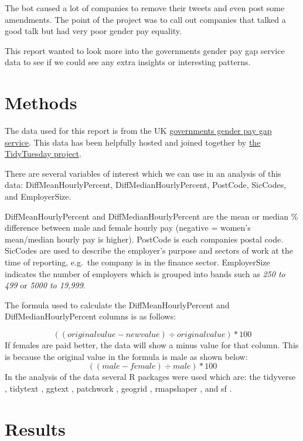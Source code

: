 \documentclass[
  11pt,
]{article}
\begin{document}
The bot caused a lot of companies to remove their tweets and even post
some amendments. The point of the project was to call out companies that
talked a good talk but had very poor gender pay equality.

This report wanted to look more into the governments gender pay gap
service data to see if we could see any extra insights or interesting
patterns.

\newpage

\hypertarget{methods}{%
\section{Methods}\label{methods}}

The data used for this report is from the UK
\href{https://gender-pay-gap.service.gov.uk/}{governments gender pay gap
service}. This data has been helpfully hosted and joined together by
\href{https://github.com/rfordatascience/tidytuesday/tree/master/data/2022/2022-06-28}{the
TidyTuesday project}.

There are several variables of interest which we can use in an analysis
of this data: DiffMeanHourlyPercent, DiffMedianHourlyPercent, PostCode,
SicCodes, and EmployerSize.

DiffMeanHourlyPercent and DiffMedianHourlyPercent are the mean or median
\% difference between male and female hourly pay (negative = women's
mean/median hourly pay is higher). PostCode is each companies postal
code. SicCodes are used to describe the employer's purpose and sectors
of work at the time of reporting, e.g.~the company is in the finance
sector. EmployerSize indicates the number of employers which is grouped
into bands such as \emph{250 to 499} or \emph{5000 to 19,999}.

The formula used to calculate the DiffMeanHourlyPercent and
DiffMedianHourlyPercent columns is as follows:

\[((original value - new value) \div original value) * 100\] If females
are paid better, the data will show a minus value for that column. This
is because the original value in the formula is male as shown below:
\[((male - female) \div male) * 100\] In the analysis of the data
several R packages were used which are: the tidyverse \citep{tidyverse},
tidytext \citep{tidytext}, ggtext \citep{ggtext}, patchwork
\citep{patchwork}, geogrid \citep{geogrid}, rmapshaper
\citep{rmapshaper}, and sf \citep{sf}.

\newpage

\hypertarget{results}{%
\section{Results}\label{results}}
\end{document}
